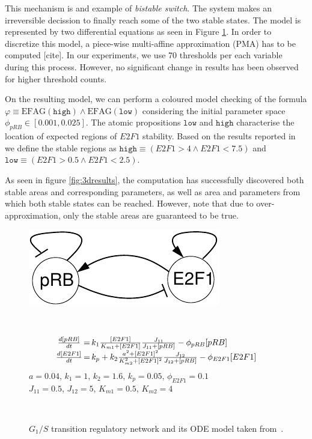 \documentclass[12pt,oneside, draft]{fithesis2}
\newcommand{\ef}[1]{\ensuremath{\mbox{EF} #1}}
\newcommand{\ag}[1]{\ensuremath{\mbox{AG} #1}}
\begin{document}
				This mechanism is and example of \emph{bistable switch}. The system makes an irreversible decission to finally reach some of the two stable states. The model is represented by two differential equations as seen in Figure \ref{fig:genmodel}. In order to discretize this model, a piece-wise multi-affine approximation (PMA) has to be computed [cite]. In our experiments, we use 70 thresholds per each variable during this process. However, no significant change in results has been observed for higher threshold counts.
				
				On the resulting model, we can perform a coloured model checking of the formula $\varphi \equiv \ef{\ag{(\mathtt{high})}}\wedge \ef{\ag{(\mathtt{low})}}$ considering the initial parameter space ${\phi_{pRB}\in[0.001,0.025]}$. The atomic propositions  $\mathtt{low}$ and $\mathtt{high}$ characterise the location of expected regions of $E2F1$ stability. Based on the results reported in~\cite{SKH04} we define the stable regions as $\mathtt{high}\equiv (E2F1>4 \wedge E2F1<7.5)$ and $\mathtt{low}\equiv ({E2F1>0.5} \wedge E2F1<2.5)$.
				
				As seen in figure \ref{fig:3dresults}, the computation has successfully discovered both stable areas and corresponding parameters, as well as area and parameters from which both stable states can be reached. However, note that due to over-approximation, only the stable areas are guaranteed to be true. 
				

\begin{figure}
  \begin{center}
       \vspace*{-6mm}
  \hspace*{-1cm}  \parbox{3.8cm}{\includegraphics[scale=.7]{gs1net.pdf}}~
\parbox{6.5cm}{
\scriptsize
$$\begin{array}{c@{$\,=\,$}l}
\frac{d[pRB]}{dt} & k_1 \frac{[E2F1]}{K_{m1}+[E2F1]}\frac{J_{11}}{J_{11}+[pRB]}  - \phi_{pRB}[pRB]\\[1mm]
\frac{d[E2F1]}{dt} & k_p + k_2 \frac{a^2+[E2F1]^2}{K_{m2}^2+[E2F1]^2}\frac{J_{12}}{J_{12}+[pRB]} - \phi_{E2F1} [E2F1]
\end{array}$$
$a = 0.04$, $k_1=1$, $k_2=1.6$, $k_p=0.05$, $\phi_{E2F1}=0.1$ \\ $J_{11}=0.5$, $J_{12}=5$, $K_{m1}=0.5$, $K_{m2}=4$
}\\
    \end{center}
\caption{$G_1/S$ transition regulatory network and its ODE model taken from~\cite{SKH04}.}
\label{fig:genmodel}
\end{figure}
\end{document}
